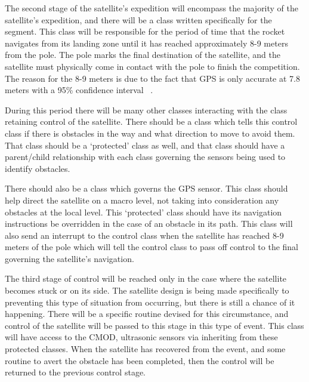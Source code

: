 \documentclass[10pt,letterpaper,onecolumn,journal]{IEEEtran}
\begin{document}
\par
The second stage of the satellite's expedition will encompass the majority of the satellite's expedition, and there will be a class written specifically for the segment. This class will be responsible for the period of time that the rocket navigates from its landing zone until it has reached approximately 8-9 meters from the pole. The pole marks the final destination of the satellite, and the satellite must physically come in contact with the pole to finish the competition. The reason for the 8-9 meters is due to the fact that GPS is only accurate at 7.8 meters with a 95\% confidence interval ~\cite{gov2016}.\vspace{.3cm}
\par
During this period there will be many other classes interacting with the class retaining control of the satellite. There should be a class which tells this control class if there is obstacles in the way and what direction to move to avoid them. That class should be a ‘protected’ class as well, and that class should have a parent/child relationship with each class governing the sensors being used to identify obstacles.\vspace{.3cm}
\par 
There should also be a class which governs the GPS sensor. This class should help direct the satellite on a macro level, not taking into consideration any obstacles at the local level. This ‘protected’ class should have its navigation instructions be overridden in the case of an obstacle in its path. This class will also send an interrupt to the control class when the satellite has reached 8-9 meters of the pole which will tell the control class to pass off control to the final governing the satellite's navigation.\vspace{.3cm}
\par
The third stage of control will be reached only in the case where the satellite becomes stuck or on its side. The satellite design is being made specifically to preventing this type of situation from occurring, but there is still a chance of it happening. There will be a specific routine devised for this circumstance, and control of the satellite will be passed to this stage in this type of event. This class will have access to the CMOD, ultrasonic sensors via inheriting from these protected classes. When the satellite has recovered from the event, and some routine to avert the obstacle has been completed, then the control will be returned to the previous control stage.\vspace{.3cm}
\end{document}
